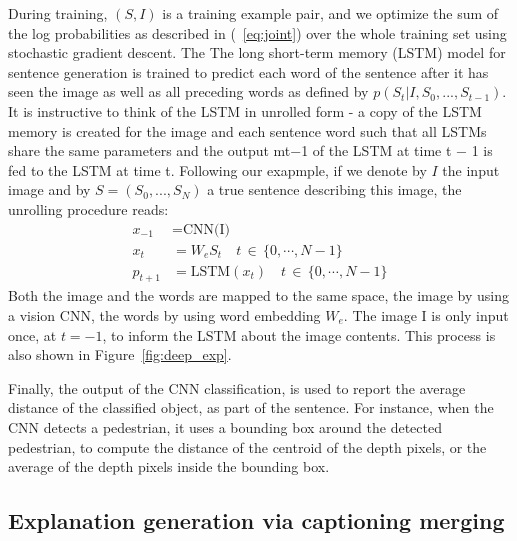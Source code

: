 During training, $(S, I)$ is a training example pair, and we optimize the sum of the log probabilities as described in (~\ref{eq:joint}) over the whole training set using stochastic gradient descent.
The The long short-term memory (LSTM) model for sentence generation is trained to predict each word of the sentence after it has seen the image as well as all preceding words as defined by $p(S_t|I, S_0, . . . , S_{t-1})$.
It is instructive to think of the LSTM in unrolled form - a copy of the LSTM memory is created for the image and each sentence word such that all LSTMs share the same parameters and the output mt−1 of the LSTM at time t − 1 is fed to the LSTM at time t. 
Following our exapmple, if we denote by $I$ the input image and by $S = (S_0, . . . , S_N )$ a true sentence describing this image, the unrolling procedure reads:
\begin{align}
    x_{-1} &= \text{CNN(I)} \\
    x_t &= W_e S_t \quad t \, \in \, \{0, \cdots, N-1 \} \\
    p_{t+1} &= \text{LSTM}(x_t)  \quad t \, \in \, \{0, \cdots, N-1 \}
\end{align}
Both the image and the words are mapped to the same space, the image by using a vision CNN, the words by using word embedding $W_e$.
The image I is only input once, at $t = −1$, to inform the LSTM about the image contents. This process is also shown in Figure~\ref{fig:deep_exp}.

Finally, the output of the CNN classification, is used to report the average distance of the classified object, as part of the sentence. For instance, when the CNN detects a pedestrian, it uses a bounding box around the detected pedestrian, to compute the distance of the centroid of the depth pixels, or the average of the depth pixels inside the bounding box. 

\subsection{Explanation generation via captioning merging}
\label{subsec:explain}

